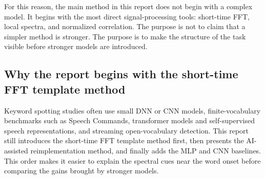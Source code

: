 For this reason, the main method in this report does not begin with a complex model. It begins with the most direct signal-processing tools: short-time FFT, local spectra, and normalized correlation. The purpose is not to claim that a simpler method is stronger. The purpose is to make the structure of the task visible before stronger models are introduced.

\subsection{Why the report begins with the short-time FFT template method}

Keyword spotting studies often use small DNN or CNN models\cite{chen2014kws,sainath2015}, finite-vocabulary benchmarks such as Speech Commands\cite{warden2018}, transformer models and self-supervised speech representations\cite{berg2021,baevski2020,hsu2021hubert,chen2022wavlm,gao2023}, and streaming open-vocabulary detection\cite{kim2025}. This report still introduces the short-time FFT template method first, then presents the AI-assisted reimplementation method, and finally adds the MLP and CNN baselines. This order makes it easier to explain the spectral cues near the word onset before comparing the gains brought by stronger models.
